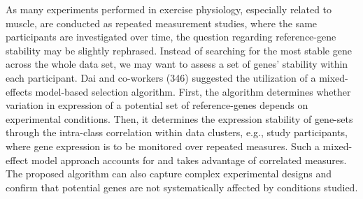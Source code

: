 \documentclass[twoside,10pt]{gihclass} %
\begin{document}
As many experiments performed in exercise physiology, especially related to muscle, are conducted as repeated measurement studies, where the same participants are investigated over time, the question regarding reference-gene stability may be slightly rephrased. Instead of searching for the most stable gene across the whole data set, we may want to assess a set of genes' stability within each participant.
Dai and co-workers (346) suggested the utilization of a mixed-effects model-based selection algorithm.
First, the algorithm determines whether variation in expression of a potential set of reference-genes depends on experimental conditions.
Then, it determines the expression stability of gene-sets through the intra-class correlation within data clusters, e.g., study participants, where gene expression is to be monitored over repeated measures.
Such a mixed-effect model approach accounts for and takes advantage of correlated measures.
The proposed algorithm can also capture complex experimental designs and confirm that potential genes are not systematically affected by conditions studied.
\end{document}
